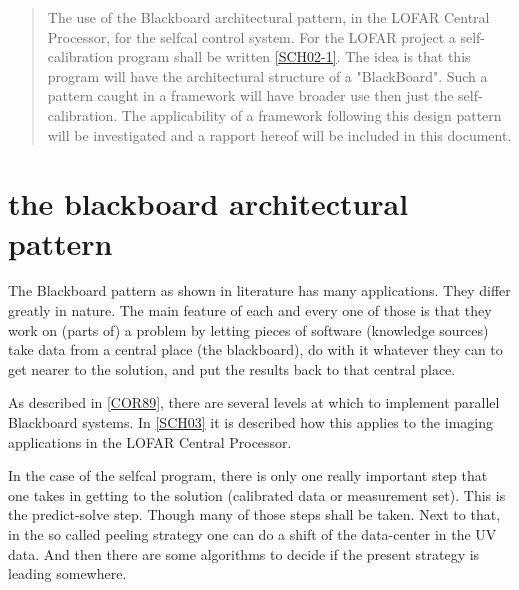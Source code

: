 \documentclass[]{lofar}
\begin{document}
  \maketitle

  \begin{abstract}

    The use of the Blackboard architectural pattern, in the LOFAR
    Central Processor, for the selfcal control system.  For the LOFAR
    project a self-calibration program shall be written
    \hyperlink{LOFAR-ASTRON-ADD-006}{[SCH02-1]}. The idea
    is that this program will have the architectural structure of a
    "BlackBoard". Such a pattern caught in a framework will have
    broader use then just the self-calibration. The applicability of a
    framework following this design pattern will be investigated and a
    rapport hereof will be included in this document.

  \end{abstract}

  \tableofcontents

  \listoffigures

  \listoftables

  \section{the blackboard architectural pattern}
  \label{sec:blackboard-architectural-pattern}

    The Blackboard pattern as shown in literature has many
    applications. They differ greatly in nature. The main feature of
    each and every one of those is that they work on (parts of) a
    problem by letting pieces of software (knowledge sources) take
    data from a central place (the blackboard), do with it whatever
    they can to get nearer to the solution, and put the results back
    to that central place.

    As described in \hyperlink{bib:Design-Alternatives}{[COR89]}, there are
    several levels at which to implement parallel Blackboard
    systems. In \hyperlink{bib:PDR-CEP-Software}{[SCH03]} it is
    described how this applies to the imaging applications in the
    LOFAR Central Processor.

    In the case of the selfcal program, there is only one really
    important step that one takes in getting to the solution
    (calibrated data or measurement set). This is the predict-solve
    step. Though many of those steps shall be taken. Next to that, in
    the so called peeling strategy one can do a shift of the
    data-center in the UV data. And then there are some algorithms to
    decide if the present strategy is leading somewhere.
\end{document}
